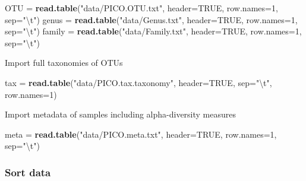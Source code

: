 \documentclass[]{article}
\newenvironment{Shaded}{\begin{snugshade}}{\end{snugshade}}
\newcommand{\KeywordTok}[1]{\textcolor[rgb]{0.13,0.29,0.53}{\textbf{#1}}}
\newcommand{\DataTypeTok}[1]{\textcolor[rgb]{0.13,0.29,0.53}{#1}}
\newcommand{\DecValTok}[1]{\textcolor[rgb]{0.00,0.00,0.81}{#1}}
\newcommand{\CharTok}[1]{\textcolor[rgb]{0.31,0.60,0.02}{#1}}
\newcommand{\StringTok}[1]{\textcolor[rgb]{0.31,0.60,0.02}{#1}}
\newcommand{\OtherTok}[1]{\textcolor[rgb]{0.56,0.35,0.01}{#1}}
\newcommand{\NormalTok}[1]{#1}
\begin{document}
\begin{Shaded}
\begin{Highlighting}[]
\NormalTok{OTU =}\StringTok{ }\KeywordTok{read.table}\NormalTok{(}\StringTok{"data/PICO.OTU.txt"}\NormalTok{, }\DataTypeTok{header=}\OtherTok{TRUE}\NormalTok{, }\DataTypeTok{row.names=}\DecValTok{1}\NormalTok{, }\DataTypeTok{sep=}\StringTok{"}\CharTok{\textbackslash{}t}\StringTok{"}\NormalTok{)}
\NormalTok{genus =}\StringTok{ }\KeywordTok{read.table}\NormalTok{(}\StringTok{"data/Genus.txt"}\NormalTok{, }\DataTypeTok{header=}\OtherTok{TRUE}\NormalTok{, }\DataTypeTok{row.names=}\DecValTok{1}\NormalTok{, }\DataTypeTok{sep=}\StringTok{"}\CharTok{\textbackslash{}t}\StringTok{"}\NormalTok{)}
\NormalTok{family =}\StringTok{ }\KeywordTok{read.table}\NormalTok{(}\StringTok{"data/Family.txt"}\NormalTok{, }\DataTypeTok{header=}\OtherTok{TRUE}\NormalTok{, }\DataTypeTok{row.names=}\DecValTok{1}\NormalTok{, }\DataTypeTok{sep=}\StringTok{"}\CharTok{\textbackslash{}t}\StringTok{"}\NormalTok{)}
\end{Highlighting}
\end{Shaded}

Import full taxonomies of OTUs

\begin{Shaded}
\begin{Highlighting}[]
\NormalTok{tax =}\StringTok{ }\KeywordTok{read.table}\NormalTok{(}\StringTok{"data/PICO.tax.taxonomy"}\NormalTok{, }\DataTypeTok{header=}\OtherTok{TRUE}\NormalTok{, }\DataTypeTok{sep=}\StringTok{"}\CharTok{\textbackslash{}t}\StringTok{"}\NormalTok{, }\DataTypeTok{row.names=}\DecValTok{1}\NormalTok{)}
\end{Highlighting}
\end{Shaded}

Import metadata of samples including alpha-diversity measures

\begin{Shaded}
\begin{Highlighting}[]
\NormalTok{meta =}\StringTok{ }\KeywordTok{read.table}\NormalTok{(}\StringTok{"data/PICO.meta.txt"}\NormalTok{, }\DataTypeTok{header=}\OtherTok{TRUE}\NormalTok{, }\DataTypeTok{row.names=}\DecValTok{1}\NormalTok{, }\DataTypeTok{sep=}\StringTok{"}\CharTok{\textbackslash{}t}\StringTok{"}\NormalTok{)}
\end{Highlighting}
\end{Shaded}

\subsubsection{Sort data}\label{sort-data}
\end{document}
